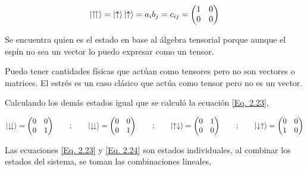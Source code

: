 \documentclass[11pt,fleqn]{book}
\begin{document}
\begin{equation}
\ket{\upuparrows}=\ket{\uparrow}\ket{\uparrow}=a_{i}b_{j}=c_{ij}=\begin{pmatrix}
1 & 0 \\ 
0 & 0
\end{pmatrix} 
\label{Eq. 2.23}
\end{equation}

Se encuentra quien es el estado en base al álgebra tensorial porque aunque el espín no sea un vector lo puedo expresar como un tensor.

\begin{example}
Puedo tener cantidades físicas que actúan como tensores pero no son vectores o matrices.
El estrés es un caso clásico que actúa como tensor pero no es un vector.
\end{example}

Calculando los demás estados igual que se calculó la ecuación \ref{Eq. 2.23},

\begin{equation}
    \ket{\downdownarrows}=\begin{pmatrix}
                            0 & 0 \\ 
                            0 & 1
\end{pmatrix} \qquad;\qquad\ket{\downdownarrows}=\begin{pmatrix}
                                                    0 & 0 \\ 
                                                    0 & 1
\end{pmatrix} \qquad;\qquad\ket{\uparrow\downarrow}=\begin{pmatrix}
                                                    0 & 1 \\ 
                                                    0 & 0
\end{pmatrix} \qquad;\qquad\ket{\downarrow\uparrow}=\begin{pmatrix}
                                                    0 & 0 \\ 
                                                    1 & 0
\end{pmatrix} 
\label{Eq. 2.24}
\end{equation}

Las ecuaciones \ref{Eq. 2.23} y \ref{Eq. 2.24} son estados individuales, al combinar los estados del sistema, se toman las combinaciones lineales,
\end{document}
